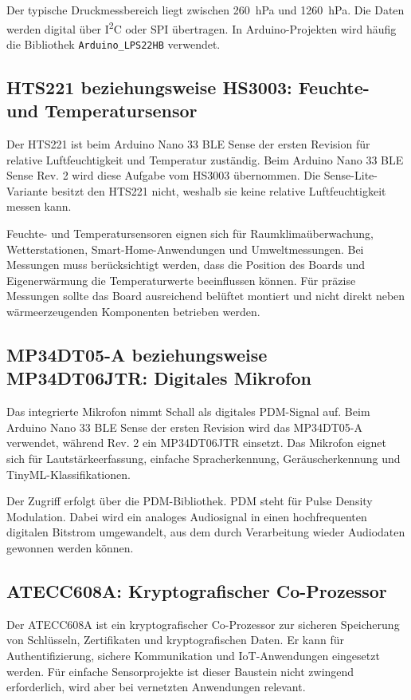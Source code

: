 Der typische Druckmessbereich liegt zwischen 260~hPa und 1260~hPa. Die Daten werden digital über I\textsuperscript{2}C oder SPI übertragen. In Arduino-Projekten wird häufig die Bibliothek \texttt{Arduino\_LPS22HB} verwendet.

\subsection{HTS221 beziehungsweise HS3003: Feuchte- und Temperatursensor}

Der HTS221 ist beim Arduino Nano 33 BLE Sense der ersten Revision für relative Luftfeuchtigkeit und Temperatur zuständig. Beim Arduino Nano 33 BLE Sense Rev. 2 wird diese Aufgabe vom HS3003 übernommen. Die Sense-Lite-Variante besitzt den HTS221 nicht, weshalb sie keine relative Luftfeuchtigkeit messen kann.

Feuchte- und Temperatursensoren eignen sich für Raumklimaüberwachung, Wetterstationen, Smart-Home-Anwendungen und Umweltmessungen. Bei Messungen muss berücksichtigt werden, dass die Position des Boards und Eigenerwärmung die Temperaturwerte beeinflussen können. Für präzise Messungen sollte das Board ausreichend belüftet montiert und nicht direkt neben wärmeerzeugenden Komponenten betrieben werden.

\subsection{MP34DT05-A beziehungsweise MP34DT06JTR: Digitales Mikrofon}

Das integrierte Mikrofon nimmt Schall als digitales PDM-Signal auf. Beim Arduino Nano 33 BLE Sense der ersten Revision wird das MP34DT05-A verwendet, während Rev. 2 ein MP34DT06JTR einsetzt. Das Mikrofon eignet sich für Lautstärkeerfassung, einfache Spracherkennung, Geräuscherkennung und TinyML-Klassifikationen.

Der Zugriff erfolgt über die PDM-Bibliothek. PDM steht für Pulse Density Modulation. Dabei wird ein analoges Audiosignal in einen hochfrequenten digitalen Bitstrom umgewandelt, aus dem durch Verarbeitung wieder Audiodaten gewonnen werden können.

\subsection{ATECC608A: Kryptografischer Co-Prozessor}

Der ATECC608A ist ein kryptografischer Co-Prozessor zur sicheren Speicherung von Schlüsseln, Zertifikaten und kryptografischen Daten. Er kann für Authentifizierung, sichere Kommunikation und IoT-Anwendungen eingesetzt werden. Für einfache Sensorprojekte ist dieser Baustein nicht zwingend erforderlich, wird aber bei vernetzten Anwendungen relevant.

